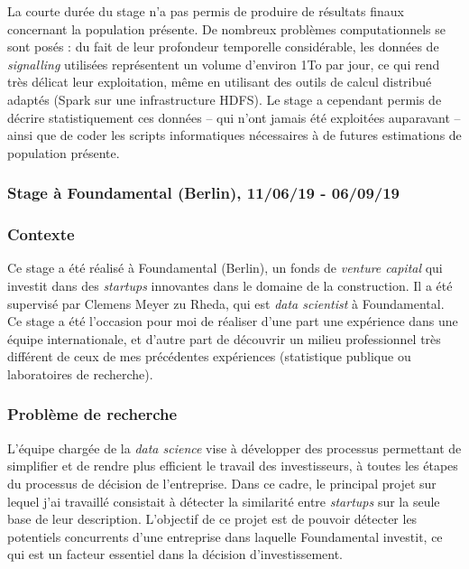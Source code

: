 La courte durée du stage n'a pas permis de produire de résultats finaux concernant la population présente. De nombreux problèmes computationnels se sont posés : du fait de leur profondeur temporelle considérable, les données de \textit{signalling} utilisées représentent un volume d'environ 1To par jour, ce qui rend très délicat leur exploitation, même en utilisant des outils de calcul distribué adaptés (Spark sur une infrastructure HDFS). Le stage a cependant permis de décrire statistiquement ces données -- qui n'ont jamais été exploitées auparavant -- ainsi que de coder les scripts informatiques nécessaires à de futures estimations de population présente.

\subsubsection*{Stage à Foundamental (Berlin), 11/06/19 - 06/09/19}

\subsubsection*{Contexte}

Ce stage a été réalisé à Foundamental (Berlin), un fonds de \textit{venture capital} qui investit dans des \textit{startups} innovantes dans le domaine de la construction. Il a été supervisé par Clemens Meyer zu Rheda, qui est \textit{data scientist} à Foundamental. Ce stage a été l'occasion pour moi de réaliser d'une part une expérience dans une équipe internationale, et d'autre part de découvrir un milieu professionnel très différent de ceux de mes précédentes expériences (statistique publique ou laboratoires de recherche).

\subsubsection*{Problème de recherche}

L'équipe chargée de la \textit{data science} vise à développer des processus permettant de simplifier et de rendre plus efficient le travail des investisseurs, à toutes les étapes du processus de décision de l'entreprise. Dans ce cadre, le principal projet sur lequel j'ai travaillé consistait à détecter la similarité entre \textit{startups} sur la seule base de leur description. L'objectif de ce projet est de pouvoir détecter les potentiels concurrents d'une entreprise dans laquelle Foundamental investit, ce qui est un facteur essentiel dans la décision d'investissement. 

